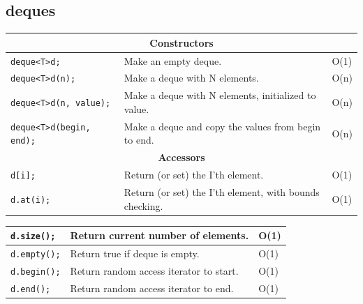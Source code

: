 \documentclass[12 pt, twoside] {article}
\begin{document}
{\subsection*{deques}
\begin{table}[h]
\centering
\begin{tabular}{|l|l|l|}
\hline
\multicolumn{3}{|c|}{\textbf{Constructors}}                                                                                      \\ \hline
\texttt{deque\textless T\textgreater d;}             & Make an empty deque.                                    & O(1)             \\ \hline
\texttt{deque\textless T\textgreater d(n);}          & Make a deque with N elements.                           & O(n)             \\ \hline
\texttt{deque\textless T\textgreater d(n, value);}   & Make a deque with N elements, initialized to value.     & O(n)             \\ \hline
\texttt{deque\textless T\textgreater d(begin, end);} & Make a deque and copy the values from begin to end.     & O(n)             \\ \hline
\multicolumn{3}{|c|}{\textbf{Accessors}}                                                                                         \\ \hline
\texttt{d{[}i{]}; }                                 & Return (or set) the I'th element.                       & O(1)             \\ \hline
\texttt{d.at(i);  }                                 & Return (or set) the I'th element, with bounds checking. & O(1)             \\ \hline
\end{tabular}
\end{table}
\begin{table}
    \begin{tabular}{|l|l|l|}\hline
\texttt{d.size(); }                                 & Return current number of elements.                      & O(1)             \\ \hline
\texttt{d.empty();}                                 & Return true if deque is empty.                          & O(1)             \\ \hline
\texttt{d.begin();}                                 & Return random access iterator to start.                 & O(1)             \\ \hline
\texttt{d.end();  }                                 & Return random access iterator to end.                   & O(1)             \\ \hline

\end{tabular}
\end{table}}
\end{document}

